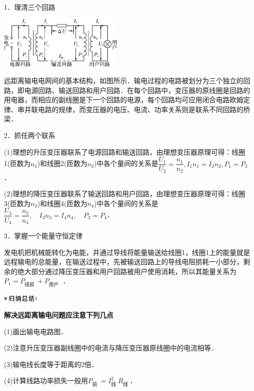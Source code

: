 \documentclass[cn,10.5pt,chinese,mac,chinesefont=founder]{elegantbook}
\begin{document}
1．理清三个回路

\begin{center}\includegraphics[width=2.40556in,height=1.01875in]{media/image463.png}\end{center}

远距离输电电网间的基本结构，如图所示．输电过程的电路被划分为三个独立的回路，即电源回路、输送回路和用户回路．在每个回路中，变压器的原线圈是回路的用电器，而相应的副线圈是下一个回路的电源，每个回路均可应用闭合电路欧姆定律、串并联电路的规律，而变压器的电压、电流、功率关系则是联系不同回路的桥梁．

2．抓任两个联系

(1)理想的升压变压器联系了电源回路和输送回路，由理想变压器原理可得：线圈1(匝数为$n_1$)和线圈2(匝数为$n_2$)中各个量间的关系是$\dfrac{U_{1}}{U_{2}}=\dfrac{n_{1}}{n_{2}}, I_{1} n_{1}=I_{2} n_{2}, P_{1}=P_{2}$．

(2)理想的降压变压器联系了输送回路和用户回路，由理想变压器原理可得：线圈3(匝数为$n_3$)和线圈4(匝数为$n_4$)中各个量间的关系是$\dfrac{U_{3}}{U_{4}}=\dfrac{n_{3}}{n_{4}}, \quad I_{3} n_{3}=I_{4} n_{4}, \quad P_{3}=P_{4}$．

3．掌握一个能量守恒定律

发电机把机械能转化为电能，并通过导线将能量输送给线圈1，线圈1上的能量就是远程输电的总能量，在输送过程中，先被输送回路上的导线电阻损耗一小部分，剩余的绝大部分通过降压变压器和用户回路被用户使用消耗，所以其能量关系为$P_{1}=P_{\text {线损 }}+P_{\text {用户 }}$ ．

\begin{center}\includegraphics[width=0.70764in,height=0.12292in]{media/image13.png}\end{center}
\begin{center}
	\textbf{解决远距离输电问题应注意下列几点}
\end{center}

(1)画出输电电路图．

(2)注意升压变压器副线圈中的电流与降压变压器原线圈中的电流相等．

(3)输电线长度等于距离的2倍．

(4)计算线路功率损失一般用$P_{\text {损 }}=I_{\text {线 }}^2R_{\text {线 }}$．
\end{document}
